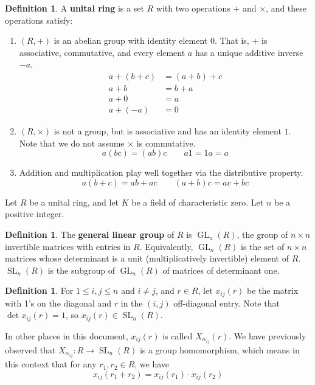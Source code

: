 \documentclass[12pt]{article}
\theoremstyle{definition}
\newtheorem{definition}[theorem]{Definition}
\newcommand{\tbf}{\textbf}
\newcommand{\noi}{\noindent}
\DeclareMathOperator{\SL}{SL}
\DeclareMathOperator{\GL}{GL}
\begin{document}
\begin{definition}
A \tbf{unital ring} is a set $R$ with two operations $+$ and $\times$, and these operations satisfy:
\begin{enumerate}
	\item $(R, +)$ is an abelian group with identity element $0$. That is, $+$ is associative, commutative, and every element $a$ has a unique additive inverse $-a$.
	\begin{align*}
		a + (b+c) &= (a+b) + c \\ 
		a+ b &= b+a \\
		a + 0 &= a \\
		a + (-a) &= 0
	\end{align*}
	\item $(R, \times)$ is not a group, but is associative and has an identity element $1$. Note that we do not assume $\times$ is commutative.
	\[
		a(bc) = (ab)c \qquad a1 = 1a = a
	\]
	\item Addition and multiplication play well together via the distributive property.
	\[
		a(b+c) = ab + ac \qquad (a+b)c = ac + bc
	\]
\end{enumerate}
\end{definition}

\noi Let $R$ be a unital ring, and let $K$ be a field of characteristic zero. Let $n$ be a positive integer.

\begin{definition}
The \tbf{general linear group} of $R$ is $\GL_n(R)$, the group of $n \times n$ invertible matrices with entries in $R$. Equivalently, $\GL_n(R)$ is the set of $n \times n$ matrices whose determinant is a unit (multiplicatively invertible) element of $R$. $\SL_n(R)$ is the subgroup of $\GL_n(R)$ of matrices of determinant one.
\end{definition}

\begin{definition}
For $1 \le i,j \le n$ and $i \neq j$, and $r \in R$, let $x_{ij}(r)$ be the matrix with 1's on the diagonal and $r$ in the $(i,j)$ off-diagonal entry. Note that $\det x_{ij}(r) = 1$, so $x_{ij}(r) \in \SL_n(R)$.

In other places in this document, $x_{ij}(r)$ is called $X_{\alpha_{ij}}(r)$. We have previously observed that $X_{\alpha_{ij}}:R \to \SL_n(R)$ is a group homomorphism, which means in this context that for any $r_1, r_2 \in R$, we have
\[
	x_{ij}(r_1 + r_2) = x_{ij}(r_1) \cdot x_{ij}(r_2)
\]
\end{definition}
\end{document}
